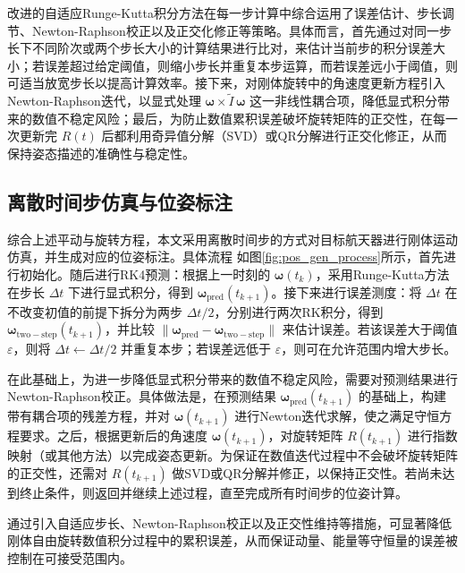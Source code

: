 改进的自适应Runge-Kutta积分方法在每一步计算中综合运用了误差估计、步长调节、Newton-Raphson校正以及正交化修正等策略。具体而言，首先通过对同一步长下不同阶次或两个步长大小的计算结果进行比对，来估计当前步的积分误差大小；若误差超过给定阈值，则缩小步长并重复本步运算，而若误差远小于阈值，则可适当放宽步长以提高计算效率。接下来，对刚体旋转中的角速度更新方程引入Newton-Raphson迭代，以显式处理 \(\boldsymbol{\omega} \times \widetilde{I}\,\boldsymbol{\omega}\) 这一非线性耦合项，降低显式积分带来的数值不稳定风险；最后，为防止数值累积误差破坏旋转矩阵的正交性，在每一次更新完 \(R(t)\) 后都利用奇异值分解（SVD）或QR分解进行正交化修正，从而保持姿态描述的准确性与稳定性。



\subsection{离散时间步仿真与位姿标注}

综合上述平动与旋转方程，本文采用离散时间步的方式对目标航天器进行刚体运动仿真，并生成对应的位姿标注。具体流程
如图\ref{fig:pos_gen_process}所示，首先进行初始化。随后进行RK4预测：根据上一时刻的 \(\boldsymbol{\omega}(t_k)\)，采用Runge-Kutta方法在步长 \(\Delta t\) 下进行显式积分，得到 \(\boldsymbol{\omega}_{\mathrm{pred}}(t_{k+1})\)。接下来进行误差测度：将 \(\Delta t\) 在不改变初值的前提下拆分为两步 \(\Delta t/2\)，分别进行两次RK积分，得到 \(\boldsymbol{\omega}_{\mathrm{two-step}}(t_{k+1})\)，并比较 \(\|\boldsymbol{\omega}_{\mathrm{pred}} - \boldsymbol{\omega}_{\mathrm{two-step}}\|\) 来估计误差。若该误差大于阈值 \(\varepsilon\)，则将 \(\Delta t \leftarrow \Delta t / 2\) 并重复本步；若误差远低于 \(\varepsilon\)，则可在允许范围内增大步长。

在此基础上，为进一步降低显式积分带来的数值不稳定风险，需要对预测结果进行Newton-Raphson校正。具体做法是，在预测结果 \(\boldsymbol{\omega}_{\mathrm{pred}}(t_{k+1})\) 的基础上，构建带有耦合项的残差方程，并对 \(\boldsymbol{\omega}(t_{k+1})\) 进行Newton迭代求解，使之满足守恒方程要求。之后，根据更新后的角速度 \(\boldsymbol{\omega}(t_{k+1})\)，对旋转矩阵 \(R(t_{k+1})\) 进行指数映射（或其他方法）以完成姿态更新。为保证在数值迭代过程中不会破坏旋转矩阵的正交性，还需对 \(R(t_{k+1})\) 做SVD或QR分解并修正，以保持正交性。若尚未达到终止条件，则返回并继续上述过程，直至完成所有时间步的位姿计算。



通过引入自适应步长、Newton-Raphson校正以及正交性维持等措施，可显著降低刚体自由旋转数值积分过程中的累积误差，从而保证动量、能量等守恒量的误差被控制在可接受范围内。

